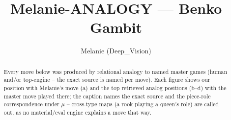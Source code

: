 \documentclass[11pt]{article}
\title{Melanie-ANALOGY — Benko Gambit}
\author{Melanie (Deep\_Vision)}
\date{}
\begin{document}
\maketitle

\begin{abstract}Every move below was produced by relational analogy to named master games (human and/or top-engine -- the exact source is named per move). Each figure shows our position with Melanie's move (a) and the top retrieved analog positions (b--d) with the master move played there; the caption names the exact source and the piece-role correspondence under $\mu$ -- cross-type maps (a rook playing a queen's role) are called out, as no material/eval engine explains a move that way.\end{abstract}

\begin{figure}[p]\centering
\begin{subfigure}{0.46\textwidth}\centering
\resizebox{\linewidth}{!}{%
\newchessgame
\chessboard[
  setfen={rn1qkb1r/3ppp1p/b4np1/2pP4/8/2N5/PP2PPPP/R1BQKBNR w KQkq - 0 7},
  showmover=false,
  pgfstyle=straightmove, color=movearrow, markmove={e2-e4}
]}
\caption{}
\end{subfigure}\hfill
\begin{subfigure}{0.46\textwidth}\centering
\resizebox{\linewidth}{!}{%
\newchessgame
\chessboard[
  setfen={rn1qkb1r/3ppp1p/b4np1/2pP4/8/2N5/PP2PPPP/R1BQKBNR w KQkq - 0 7},
  showmover=false,
  pgfstyle=straightmove, color=movearrow, markmove={e2-e4}
]}
\caption{}
\end{subfigure}
\\[4pt]
\begin{subfigure}{0.46\textwidth}\centering
\resizebox{\linewidth}{!}{%
\newchessgame
\chessboard[
  setfen={rn1qkb1r/3ppp1p/b4np1/2pP4/8/2N5/PP2PPPP/R1BQKBNR w KQkq - 0 7},
  showmover=false,
  pgfstyle=straightmove, color=movearrow, markmove={e2-e4}
]}
\caption{}
\end{subfigure}\hfill
\begin{subfigure}{0.46\textwidth}\centering
\resizebox{\linewidth}{!}{%
\newchessgame
\chessboard[
  setfen={rn1qkb1r/3ppp1p/b4np1/2pP4/8/2N5/PP2PPPP/R1BQKBNR w KQkq - 0 7},
  showmover=false,
  pgfstyle=straightmove, color=movearrow, markmove={e2-e4}
]}
\caption{}
\end{subfigure}

\end{figure}
\end{document}
